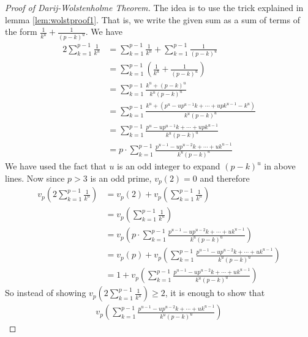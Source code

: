\documentclass{subfile}
\begin{document}
	\begin{proof}[Proof of Darij-Wolstenholme Theorem]
		The idea is to use the trick explained in lemma \eqref{lem:wolstproof1}. That is, we write the given sum as a sum of terms of the form $\frac{1}{k^u}+\frac{1}{(p-k)^u}$. We have
		\begin{align*}
		2\sum_{k = 1}^{p - 1}\frac {1}{k^{u}} &= \sum_{k = 1}^{p - 1}\frac {1}{k^{u}} + \sum_{k = 1}^{p - 1}\frac {1}{\left(p - k\right)^{u}}\\
		&= \sum_{k = 1}^{p - 1}\left(\frac {1}{k^{u}} + \frac {1}{\left(p - k\right)^{u}}\right) \\
		&= \sum_{k = 1}^{p - 1}\frac {k^{u} + \left(p - k\right)^{u}}{k^{u}\left(p - k\right)^{u}}\\
		&=\sum_{k = 1}^{p - 1}\frac {k^{u} + \left(p^{u} - up^{u - 1}k+ \cdots + upk^{u - 1} - k^{u}\right)}{k^{u}\left(p - k\right)^{u}} \\
		&= \sum_{k = 1}^{p - 1}\frac {p^{u} - up^{u - 1}k + \cdots + upk^{u - 1}}{k^{u}\left(p - k\right)^{u}}\\
		&=p \cdot \sum_{k = 1}^{p - 1}\frac {p^{u - 1} - up^{u - 2}k+\cdots + uk^{u - 1}}{k^{u}\left(p - k\right)^{u}}
		\end{align*}
		We have used the fact that $u$ is an odd integer to expand $(p-k)^u$ in above lines. Now since $p>3$ is an odd prime, $v_p(2)=0$ and therefore
			\begin{align*}
				v_{p}\left(2\sum_{k = 1}^{p - 1}\frac {1}{k^{u}}\right)
					&= v_{p}\left(2\right) + v_{p}\left(\sum_{k = 1}^{p - 1}\frac {1}{k^{u}}\right)\\
					& = v_{p}\left(\sum_{k = 1}^{p - 1}\frac {1}{k^{u}}\right)\\
					&=v_{p}\left(p \cdot \sum_{k = 1}^{p - 1}\frac {p^{u - 1} - up^{u - 2}k+\cdots + uk^{u - 1}}{k^{u}\left(p - k\right)^{u}}\right)\\
					&=v_{p}\left(p\right) + v_{p}\left(\sum_{k = 1}^{p - 1}\frac {p^{u - 1} - up^{u - 2}k+\cdots + uk^{u - 1}}{k^{u}\left(p - k\right)^{u}}\right)\\
					&=1+v_{p}\left(\sum_{k = 1}^{p - 1}\frac {p^{u - 1} - up^{u - 2}k+\cdots + uk^{u - 1}}{k^{u}\left(p - k\right)^{u}}\right)
			\end{align*}
		So instead of showing $v_{p}\left(2\sum_{k = 1}^{p - 1}\frac {1}{k^{u}}\right) \geq 2$, it is enough to show that
		\begin{align*}
			v_{p}\left(\sum_{k = 1}^{p - 1}\frac {p^{u - 1} - up^{u - 2}k+\cdots + uk^{u - 1}}{k^{u}\left(p - k\right)^{u}}\right)

\end{align*}
\end{proof}
\end{document}
